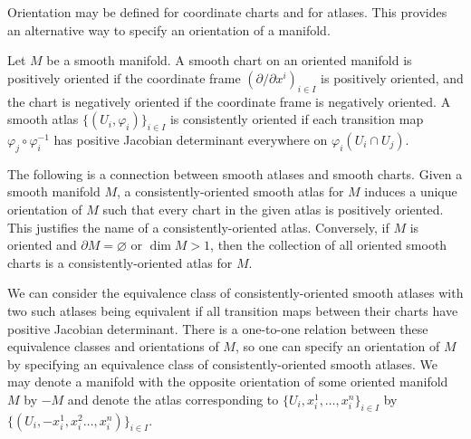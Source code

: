\documentclass[a4paper,12pt]{article}
\begin{document}
Orientation may be defined for coordinate charts and for atlases.
This provides an alternative way to specify an orientation of a manifold.
\begin{definition}\label{def:orientation_of_charts_and_atlases}
    Let $M$ be a smooth manifold.
    A smooth chart on an oriented manifold is positively oriented if the coordinate frame $(\partial/\partial x^i)_{i \in I}$ is positively oriented, and the chart is negatively oriented if the coordinate frame is negatively oriented.
    A smooth atlas $\{(U_i, \varphi_i)\}_{i \in I}$ is consistently oriented if each transition map $\varphi_j \circ \varphi_i^{-1}$ has positive Jacobian determinant everywhere on $\varphi_i(U_i \cap U_j)$.
\end{definition}
The following is a connection between smooth atlases and smooth charts.
Given a smooth manifold $M$, a consistently-oriented smooth atlas for $M$ induces a unique orientation of $M$ such that every chart in the given atlas is positively oriented.
This justifies the name of a consistently-oriented atlas.
Conversely, if $M$ is oriented and $\partial M = \varnothing$ or $\dim M > 1$, then the collection of all oriented smooth charts is a consistently-oriented atlas for $M$.

We can consider the equivalence class of consistently-oriented smooth atlases with two such atlases being equivalent if all transition maps between their charts have positive Jacobian determinant.
There is a one-to-one relation between these equivalence classes and orientations of $M$, so one can specify an orientation of $M$ by specifying an equivalence class of consistently-oriented smooth atlases.
We may denote a manifold with the opposite orientation of some oriented manifold $M$ by $-M$ and denote the atlas corresponding to $\{U_i, x^1_i, \ldots, x^n_i\}_{i \in I}$ by $\{(U_i, -x^1_i, x^2_i \ldots, x^n_i)\}_{i \in I}$.
\end{document}
